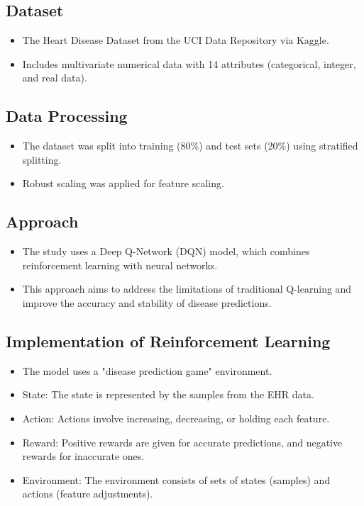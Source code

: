 \subsection*{Dataset}
\begin{itemize}
    \item The Heart Disease Dataset from the UCI Data Repository via Kaggle.
    \item Includes multivariate numerical data with 14 attributes (categorical, integer, and real data).
\end{itemize}

\subsection*{Data Processing}
\begin{itemize}
    \item The dataset was split into training (80\%) and test sets (20\%) using stratified splitting.
    \item Robust scaling was applied for feature scaling.
\end{itemize}

\subsection*{Approach}
\begin{itemize}
    \item The study uses a Deep Q-Network (DQN) model, which combines reinforcement learning with neural networks.
    \item This approach aims to address the limitations of traditional Q-learning and improve the accuracy and stability of disease predictions.
\end{itemize}

\subsection*{Implementation of Reinforcement Learning}
\begin{itemize}
    \item The model uses a "disease prediction game" environment.
    \item State: The state is represented by the samples from the EHR data.
    \item Action: Actions involve increasing, decreasing, or holding each feature.
    \item Reward: Positive rewards are given for accurate predictions, and negative rewards for inaccurate ones.
    \item Environment: The environment consists of sets of states (samples) and actions (feature adjustments).
\end{itemize}

